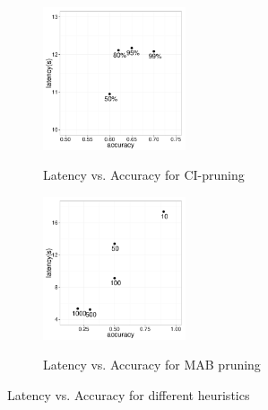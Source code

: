 \begin{figure}[h] 
\centering
\begin{subfigure}{0.49\linewidth}
\centering
{\includegraphics[width=4.2cm] {Images/latency_vs_accuracy_ci.pdf}}
\caption{Latency vs. Accuracy for CI-pruning}
\label{fig:latency_vs_accuracy_ci}
\end{subfigure}
\begin{subfigure}{0.49\linewidth}
\centering
{\includegraphics[width=4.2cm] {Images/latency_vs_accuracy_mab.pdf}}
\caption{Latency vs. Accuracy for MAB pruning}
\label{fig:latency_vs_accuracy_mab}
\end{subfigure}
\label{fig:accuracy}
\caption{Latency vs. Accuracy for different heuristics }
\end{figure}









